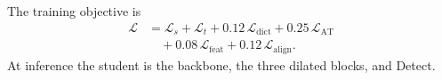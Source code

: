 The training objective is
\begin{equation}
\label{eq:total}
\begin{aligned}
\mathcal{L}
&=\mathcal{L}_s+\mathcal{L}_t
+0.12\,\mathcal{L}_{\mathrm{dict}}
+0.25\,\mathcal{L}_{\mathrm{AT}} \\
&\quad
+0.08\,\mathcal{L}_{\mathrm{feat}}
+0.12\,\mathcal{L}_{\mathrm{align}}.
\end{aligned}
\end{equation}
At inference the student is the backbone, the three dilated blocks, and Detect.
